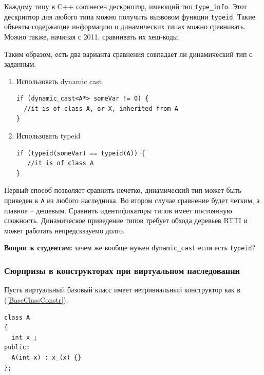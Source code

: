 \documentclass[a4paper,12pt,oneside]{article}
\newif\ifanswers
\begin{document}
Каждому типу в C++ соотнесен дескриптор, имеющий тип \lstinline!type_info!. Этот дескриптор для любого типа можно получить вызвовом функции \lstinline!typeid!. Такие объекты содержащие информацию о динамических типах можно сравнивать. Можно также, начиная с 2011, сравнивать их хеш-коды.

Таким образом, есть два варианта сравнения совпадает ли динамический тип с заданным.

\begin{enumerate}

\item Использовать dynamic cast

\begin{lstlisting}
if (dynamic_cast<A*> someVar != 0) { 
  //it is of class A, or X, inherited from A 
}
\end{lstlisting}

\item Использовать typeid

\begin{lstlisting}
if (typeid(someVar) == typeid(A)) {
   //it is of class A
}
\end{lstlisting}

\end{enumerate}

Первый способ позволяет сравнить нечетко, динамический тип может быть приведен к \lstinline!A! из любого наследника. Во втором случае сравнение будет четким, а главное -- дешевым. Сравнить идентификаторы типов имеет постоянную сложность. Динамическое приведение типов требует обхода деревьев RTTI и может работать непредсказуемо долго.

\textbf{Вопрос к студентам:} зачем же вообще нужен \lstinline!dynamic_cast! если есть \lstinline!typeid!?

\ifanswers
Правильный ответ: в первую очередь из-за сложностей приведения в связке \lstinline!typeid! + \lstinline!static_cast! (см. выше разговор о том почему в иерархиях множественного наследования нам вообще не хватает статического приведения).
\fi

\subsubsection{Сюрпризы в конструкторах при виртуальном наследовании}\label{VirtualBaseClassConstr}

Пусть виртуальный базовый класс имеет нетривиальный конструктор как в (\ref{BaseClassConstr}).

\begin{lstlisting}
class A 
{
  int x_;
public:
  A(int x) : x_(x) {}
};
\end{lstlisting}
\end{document}
